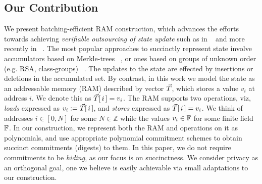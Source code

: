 \documentclass[sigconf]{acmart}
\begin{document}
\subsection{Our Contribution}\label{subsec:ourwork} 
We present batching-efficient RAM construction, which advances the efforts
towards achieving {\em verifiable outsourcing of state update} such as in ~\cite{EPRINT:BFRSBW13}
and more recently in ~\cite{USENIX:OWWB20, CCS:CFHKKO22}.
The most popular approaches to succinctly represent
state involve accumulators based on Merkle-trees ~\cite{C:Merkle87}, or ones based on groups of unknown order
(e.g. RSA, class-groups) ~\cite{C:CamLys02,C:BonBunFis19,USENIX:OWWB20, CCS:CFHKKO22}.
The updates to the state are effected by insertions or deletions in the  accumulated set.
By contrast, in this work we
model the state as an addressable memory (RAM) described by vector $\vec{T}$, which stores a value $v_i$ at address $i$.
We denote this as $\vec{T}[\,i\,]=v_i$. The RAM supports two operations, viz, {\em loads} expressed
as $v_i := \vec{T}[\,i\,]$, and {\em stores} expressed as $\vec{T}[\,i\,]=v_i$.
We think of addresses $i\in [0,N]$ for some $N\in \mathbb{Z}$ while the
values $v_i\in \mathbb{F}$ for some finite field $\mathbb{F}$. In our construction, we represent both the RAM and operations on it
as polynomials, and use appropriate polynomial commitment schemes to obtain succinct commitments (digests) to them.
In this paper, we do not require commitments to be {\em hiding}, as our focus is on succinctness.
We consider privacy as an orthogonal goal, one we believe is easily achievable
via small adaptations to our construction.\smallskip
\end{document}
